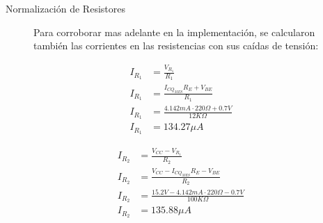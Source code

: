 \begin{frame}[allowframebreaks]{Normalización de Resistores}
  \begin{figure}[!ht]
    \raggedright
    Para corroborar mas adelante en la implementación, se calcularon también las corrientes en las resistencias con sus
    caídas de tensión:\\
    \centering
    \small
    \begin{minipage}{0.45\textwidth}
      \begin{align*}
        I_{R_1} &= \frac{V_{R_1}}{R_1}\\[6pt]
        I_{R_1} &= \frac{I_{CQ_{MES}} R_E + V_{BE}}{R_1}\\[6pt]
        I_{R_1} &= \frac{4.142mA \cdot 220\Omega + 0.7V}{12K\Omega}\\[6pt]
        I_{R_1} &= 134.27\mu A
      \end{align*}
    \end{minipage}
    \hfill
    \begin{minipage}{0.45\textwidth}
      \begin{align*}
        I_{R_2} &= \frac{V_{CC} - V_{R_1}}{R_2}\\[6pt]
        I_{R_2} &= \frac{V_{CC} - I_{CQ_{MES}} R_E - V_{BE}}{R_2}\\[6pt]
        I_{R_2} &= \frac{15.2V - 4.142mA \cdot 220\Omega - 0.7V}{100K\Omega}\\[6pt]
        I_{R_2} &= 135.88 \mu A
      \end{align*}
    \end{minipage}
  \end{figure}
  \begin{figure}[!h]
    \centering
    \begin{minipage}{0.45\textwidth}
      \centering
\end{minipage}
\end{figure}
\end{frame}
